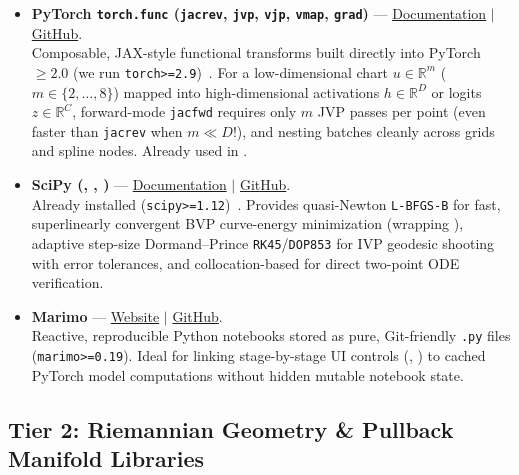 \documentclass[11pt,a4paper]{article}
\newcommand{\R}{\mathbb{R}}
\theoremstyle{definition}
\begin{document}
\begin{itemize}[leftmargin=*]
    \item \textbf{PyTorch \texttt{torch.func} (\texttt{jacrev}, \texttt{jvp}, \texttt{vjp}, \texttt{vmap}, \texttt{grad})} ---
    \href{https://pytorch.org/docs/stable/func.html}{Documentation} $\mid$ \href{https://github.com/pytorch/pytorch}{GitHub}.\\
    Composable, JAX-style functional transforms built directly into PyTorch~$\ge 2.0$ (we run \texttt{torch>=2.9})~\cite{paszke2019pytorch}. For a low-dimensional chart $u \in \R^m$ ($m \in \{2, \dots, 8\}$) mapped into high-dimensional activations $h \in \R^D$ or logits $z \in \R^C$, forward-mode \texttt{jacfwd} requires only $m$ JVP passes per point (even faster than \texttt{jacrev} when $m \ll D$!), and nesting  batches cleanly across grids and spline nodes. Already used in .

    \item \textbf{SciPy (, , )} ---
    \href{https://docs.scipy.org/doc/scipy/reference/integrate.html}{Documentation} $\mid$ \href{https://github.com/scipy/scipy}{GitHub}.\\
    Already installed (\texttt{scipy>=1.12})~\cite{virtanen2020scipy}. Provides quasi-Newton \texttt{L-BFGS-B} for fast, superlinearly convergent BVP curve-energy minimization (wrapping ), adaptive step-size Dormand--Prince \texttt{RK45}/\texttt{DOP853} for IVP geodesic shooting with error tolerances, and collocation-based  for direct two-point ODE verification.

    \item \textbf{Marimo} ---
    \href{https://marimo.io}{Website} $\mid$ \href{https://github.com/marimo-team/marimo}{GitHub}.\\
    Reactive, reproducible Python notebooks stored as pure, Git-friendly \texttt{.py} files (\texttt{marimo>=0.19}). Ideal for linking stage-by-stage UI controls (, ) to cached PyTorch model computations without hidden mutable notebook state.
\end{itemize}

\subsection{Tier 2: Riemannian Geometry \& Pullback Manifold Libraries}
\end{document}
